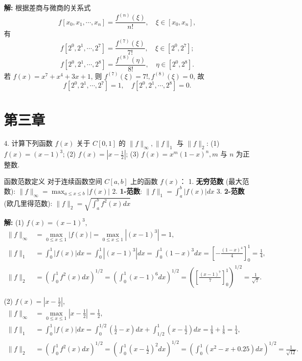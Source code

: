 \documentclass[a4paper,11pt]{ctexart}
\begin{document}
\textbf{解: } 根据差商与微商的关系式
\[
f[x_0, x_1, \cdots, x_n] = \frac{f^{(n)}(\xi)}{n!}, \quad \xi \in [x_0, x_n],
\]
有
\[
f[2^0, 2^1, \cdots, 2^7] = \frac{f^{(7)}(\xi)}{7!}, \quad \xi \in [2^0, 2^7];
\]
\[
f[2^0, 2^1, \cdots, 2^8] = \frac{f^{(8)}(\eta)}{8!}, \quad \eta \in [2^0, 2^8].
\]
若 $f(x) = x^7 + x^4 + 3x + 1$, 则 $f^{(7)}(\xi) = 7!, f^{(8)}(\xi) = 0$, 故
\[
f[2^0, 2^1, \cdots, 2^7] = 1, \quad f[2^0, 2^1, \cdots, 2^8] = 0.
\]

\newpage

\section{第三章}

4. 计算下列函数 $f(x)$ 关于 $C[0,1]$ 的 $\|f\|_\infty, \|f\|_1$ 与 $\|f\|_2$:
(1) $f(x) = (x-1)^3$;
(2) $f(x) = \left| x - \frac{1}{2} \right|$;
(3) $f(x) = x^m(1-x)^n, m$ 与 $n$ 为正整数.

\begin{theorybox}{函数范数定义}
对于连续函数空间 $C[a,b]$ 上的函数 $f(x)$：
1. \textbf{无穷范数} (最大范数): $\|f\|_\infty = \max_{a \leqslant x \leqslant b} |f(x)|$
2. \textbf{1-范数}: $\|f\|_1 = \int_a^b |f(x)| dx$
3. \textbf{2-范数} (欧几里得范数): $\|f\|_2 = \sqrt{\int_a^b f^2(x) dx}$
\end{theorybox}

\textbf{解: } (1) $f(x) = (x-1)^3$,
\begin{align*}
\|f\|_\infty &= \max_{0 \leqslant x \leqslant 1} |f(x)| = \max_{0 \leqslant x \leqslant 1} |(x-1)^3| = 1, \\
\|f\|_1 &= \int_0^1 |f(x)| dx = \int_0^1 |(x-1)^3| dx = \int_0^1 (1-x)^3 dx = \left[-\frac{(1-x)^4}{4}\right]_0^1 = \frac{1}{4}, \\
\|f\|_2 &= \left( \int_0^1 f^2(x) dx \right)^{1/2} = \left( \int_0^1 (x-1)^6 dx \right)^{1/2} = \left( \left[\frac{(x-1)^7}{7}\right]_0^1 \right)^{1/2} = \frac{1}{\sqrt{7}}.
\end{align*}

(2) $f(x) = \left| x - \frac{1}{2} \right|$,
\begin{align*}
\|f\|_\infty &= \max_{0 \leqslant x \leqslant 1} \left| x - \frac{1}{2} \right| = \frac{1}{2}, \\
\|f\|_1 &= \int_0^1 |f(x)| dx = \int_0^{1/2} \left( \frac{1}{2} - x \right) dx + \int_{1/2}^1 \left( x - \frac{1}{2} \right) dx = \frac{1}{8} + \frac{1}{8} = \frac{1}{4}, \\
\|f\|_2 &= \left( \int_0^1 f^2(x) dx \right)^{1/2} = \left( \int_0^1 \left( x - \frac{1}{2} \right)^2 dx \right)^{1/2} = \left( \int_0^1 (x^2 - x + 0.25) dx \right)^{1/2} = \frac{1}{\sqrt{12}}.
\end{align*}
\end{document}

